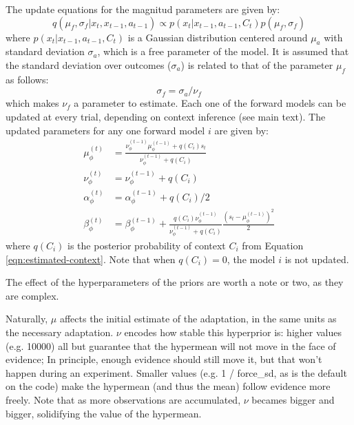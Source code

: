 \documentclass[a4paper,doc,floatsintext,natbib]{apa6}
\def \eref #1{Equation \ref{#1}}   %
\begin{document}
The update equations for the magnitud parameters are given by:
\begin{equation}
q(\mu_f, \sigma_f | x_t, x_{t-1}, a_{t-1}) \propto p(x_t |
x_{t-1}, a_{t-1}, C_t)p(\mu_f, \sigma_f) \label{eqn:context-from-x}
\end{equation}
where $p(x_t | x_{t-1}, a_{t-1}, C_t)$ is a Gaussian distribution centered
around $\mu_a$ with standard deviation $\sigma_a$, which is a free parameter of
the model. It is assumed that the standard deviation over outcomes ($\sigma_a$)
is related to that of the parameter $\mu_f$ as follows:
\begin{equation}
\sigma_f = \sigma_a / \nu_f
\end{equation}
which makes $\nu_f$ a parameter to estimate. Each one of the forward models can
be updated at every trial, depending on context inference (see main text). The
updated parameters for any one forward model $i$ are given by:
\begin{align}
  \mu_\phi^{(t)} &= \frac{\nu_\phi^{(t-1)} \mu_\phi^{(t-1)} + q(C_i)s_t}{\nu_\phi^{(t-1)} + q(C_i)} \\
  \nu_\phi^{(t)} &= \nu_\phi^{(t-1)} + q(C_i) \\
  \alpha_\phi^{(t)} &= \alpha_\phi^{(t-1)} + q(C_i) / 2 \\
  \beta_\phi^{(t)} &= \beta_\phi^{(t-1)} + \frac{q(C_i)\nu_\phi^{(t-1)}}{\nu_\phi^{(t-1)} +
                  q(C_i)}\frac{\left(s_t - \mu_\phi^{(t-1)}\right)^2}{2}
\end{align}
where $q(C_i)$ is the posterior probability of context $C_i$ from
\eref{eqn:estimated-context}. Note that when $q(C_i) = 0$, the model $i$ is not
updated.

The effect of the hyperparameters of the priors are worth a note or two, as
they are complex.

Naturally, $\mu$ affects the initial estimate of the adaptation, in the same
units as the necessary adaptation. $\nu$ encodes how stable this hyperprior is:
higher values (e.g. 10000) all but guarantee that the hypermean will not move
in the face of evidence; In principle, enough evidence should still move it,
but that won't happen during an experiment. Smaller values (e.g. 1 / force\_sd,
as is the default on the code) make the hypermean (and thus the mean) follow
evidence more freely. Note that as more observations are accumulated, $\nu$
becames bigger and bigger, solidifying the value of the hypermean.
\end{document}
